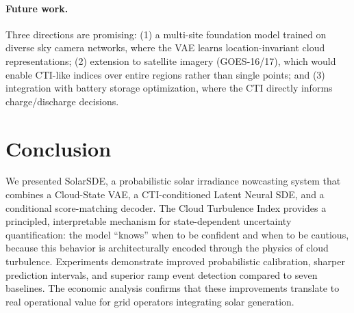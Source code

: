 \documentclass{article}
\begin{document}
\paragraph{Future work.}
Three directions are promising: (1) a multi-site foundation model trained on diverse sky camera networks, where the VAE learns location-invariant cloud representations; (2) extension to satellite imagery (GOES-16/17), which would enable CTI-like indices over entire regions rather than single points; and (3) integration with battery storage optimization, where the CTI directly informs charge/discharge decisions.

\section{Conclusion}
\label{sec:conclusion}

We presented SolarSDE, a probabilistic solar irradiance nowcasting system that combines a Cloud-State VAE, a CTI-conditioned Latent Neural SDE, and a conditional score-matching decoder. The Cloud Turbulence Index provides a principled, interpretable mechanism for state-dependent uncertainty quantification: the model ``knows'' when to be confident and when to be cautious, because this behavior is architecturally encoded through the physics of cloud turbulence. Experiments demonstrate improved probabilistic calibration, sharper prediction intervals, and superior ramp event detection compared to seven baselines. The economic analysis confirms that these improvements translate to real operational value for grid operators integrating solar generation.



\end{document}
